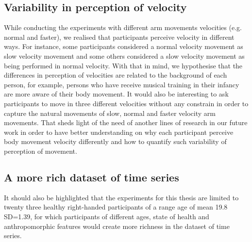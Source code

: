 \subsection{Variability in perception of velocity}

While conducting the experiments with different arm movements 
velocities (e.g. normal and faster), we realised that participants 
perceive velocity in different ways.
For instance, some participants considered a normal velocity movement 
as slow velocity movement and some others considered a 
slow velocity movement as being performed in normal velocity. 
With that in mind, we hypothesise that the differences in perception of 
velocities are related to the background of each person, for example,
persons who have receive musical training in their infancy
are more aware of their body movement. %
It would also be interesting to ask participants
to move in three different velocities without any constrain 
in order to capture the natural movements of slow, normal and faster 
velocity arm movements. 
That sheds light of the need of another lines of research in our future 
work in order to have better understanding on why each participant 
perceive body movement velocity differently and how to quantify such
variability of perception of movement.

\subsection{A more rich dataset of time series}
It should also be highlighted that the experiments for this thesis are 
limited to twenty three healthy right-handed participants of a 
range age of mean 19.8 SD=1.39, 
for which participants of different ages, state of health and 
anthropomorphic features would create more richness in the dataset 
of time series.



%
%




